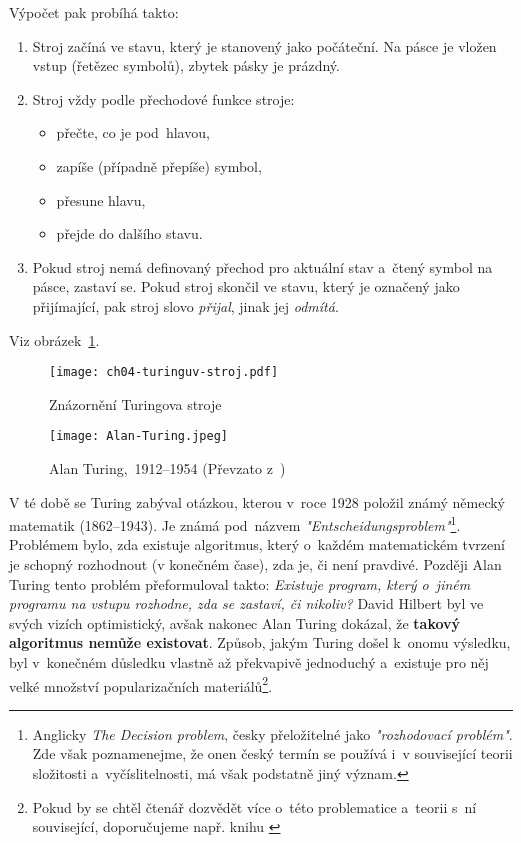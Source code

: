 Výpočet pak probíhá takto:
\begin{enumerate}
    \item Stroj začíná ve stavu, který je stanovený jako počáteční. Na pásce je vložen vstup (řetězec symbolů), zbytek pásky je prázdný.
    \item Stroj vždy podle přechodové funkce stroje:
    \begin{itemize}
        \item přečte, co je pod~hlavou,
        \item zapíše (případně přepíše) symbol,
        \item přesune hlavu,
        \item přejde do dalšího stavu.
    \end{itemize}
    \item Pokud stroj nemá definovaný přechod pro aktuální stav a~čtený symbol na pásce, zastaví se. Pokud stroj skončil ve stavu, který je označený jako přijímající, pak stroj slovo \emph{přijal}, jinak jej \emph{odmítá}.
\end{enumerate}
Viz obrázek~\ref{fig:turinguv-stroj}.
\begin{figure}[h]
    \centering
    \texttt{[image: ch04-turinguv-stroj.pdf]}
    \caption{Znázornění Turingova stroje}
    \label{fig:turinguv-stroj}
\end{figure}
\begin{figure}[h]
    \centering
    \texttt{[image: Alan-Turing.jpeg]}
    \caption[Alan Turing,~1912--1954]{Alan Turing,~1912--1954 (Převzato z~\cite{OConnorTuring2025})}
    \label{fig:alan-turing}
\end{figure}
V té době se Turing zabýval otázkou, kterou v~roce 1928 položil známý německý matematik  (1862--1943). Je známá pod~názvem \emph{"Entscheidungsproblem"}\footnote{Anglicky \emph{The Decision problem}, česky přeložitelné jako \emph{"rozhodovací problém"}. Zde však poznamenejme, že onen český termín se používá i~v související teorii složitosti a~vyčíslitelnosti, má však podstatně jiný význam.}. Problémem bylo, zda existuje algoritmus, který o~každém matematickém tvrzení je schopný rozhodnout (v konečném čase), zda je, či není pravdivé. Později Alan Turing tento problém přeformuloval takto: \emph{Existuje program, který o~jiném programu na vstupu rozhodne, zda se zastaví, či nikoliv?} David Hilbert byl ve svých vizích optimistický, avšak nakonec Alan Turing dokázal, že \textbf{takový algoritmus nemůže existovat}. Způsob, jakým Turing došel k~onomu výsledku, byl v~konečném důsledku vlastně až překvapivě jednoduchý a~existuje pro něj velké množství popularizačních materiálů\footnote{Pokud by se chtěl čtenář dozvědět více o~této problematice a~teorii s~ní související, doporučujeme např. knihu \cite{Motwani2003}}.
